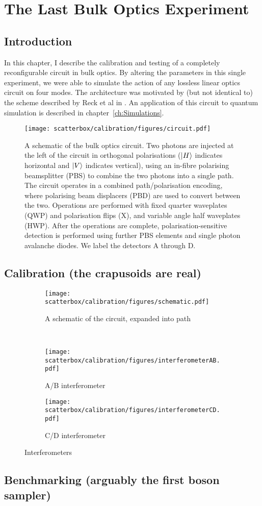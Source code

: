 \chapter{The Last Bulk Optics Experiment}
\label{ch:BulkCircuit}

\section{Introduction}
In this chapter, I describe the calibration and testing of a completely
reconfigurable circuit in bulk optics. By altering the parameters in this single
experiment, we were able to simulate the action of any lossless linear optics
circuit on four modes. The architecture was motivated by (but not identical to)
the scheme described by Reck et al in \cite{reck94}. An application of this
circuit to quantum simulation is described in chapter~\ref{ch:Simulations}.

\begin{figure}
  \centering
  \texttt{[image: scatterbox/calibration/figures/circuit.pdf]}
  \caption{A schematic of the bulk optics circuit. Two photons are injected at
the left of the circuit in orthogonal polarisations (\(\left|H\right\rangle\) indicates
horizontal and \(\left|V\right\rangle\) indicates vertical), using an in-fibre polarising
beamsplitter
(PBS) to combine the two photons into a single path. The circuit operates in a
combined path/polarisation encoding, where polarising beam displacers (PBD) are
used to convert between the two. Operations are performed with fixed quarter
waveplates (QWP) and polarisation flips (X), and variable angle half waveplates
(HWP). After the operations are complete, polarisation-sensitive detection is
performed using further PBS elements and single photon avalanche diodes. We
label the detectors A through D.}
  \label{fig:circuit}
\end{figure}

\section{Calibration (the crapusoids are real)}

\begin{figure}
  \centering
  \begin{subfigure}{\textwidth}
    \texttt{[image: scatterbox/calibration/figures/schematic.pdf]}
    \caption{A schematic of the circuit, expanded into path}
    \label{fig:schematic}
  \end{subfigure} \\
  \vspace{1cm}
  \begin{subfigure}{0.45\textwidth}
    \texttt{[image: scatterbox/calibration/figures/interferometerAB.pdf]}
    \caption{A/B interferometer}
    \label{fig:ab}
  \end{subfigure}
  \hspace{0.05\textwidth}
  \begin{subfigure}{0.45\textwidth}
    \texttt{[image: scatterbox/calibration/figures/interferometerCD.pdf]}
    \caption{C/D interferometer}
    \label{fig:cd}
  \end{subfigure}
  \caption{Interferometers}
  \label{fig:interferometers}
\end{figure}

\section{Benchmarking (arguably the first boson sampler)}
